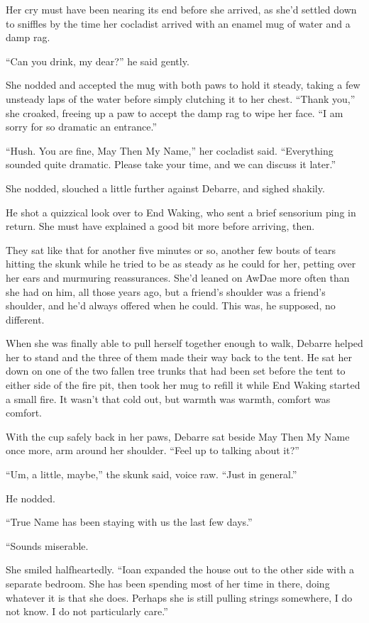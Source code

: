 Her cry must have been nearing its end before she arrived, as she'd settled down to sniffles by the time her cocladist arrived with an enamel mug of water and a damp rag.

``Can you drink, my dear?'' he said gently.

She nodded and accepted the mug with both paws to hold it steady, taking a few unsteady laps of the water before simply clutching it to her chest. ``Thank you,'' she croaked, freeing up a paw to accept the damp rag to wipe her face. ``I am sorry for so dramatic an entrance.''

``Hush. You are fine, May Then My Name,'' her cocladist said. ``Everything sounded quite dramatic. Please take your time, and we can discuss it later.''

She nodded, slouched a little further against Debarre, and sighed shakily.

He shot a quizzical look over to End Waking, who sent a brief sensorium ping in return. She must have explained a good bit more before arriving, then.

They sat like that for another five minutes or so, another few bouts of tears hitting the skunk while he tried to be as steady as he could for her, petting over her ears and murmuring reassurances. She'd leaned on AwDae more often than she had on him, all those years ago, but a friend's shoulder was a friend's shoulder, and he'd always offered when he could. This was, he supposed, no different.

When she was finally able to pull herself together enough to walk, Debarre helped her to stand and the three of them made their way back to the tent. He sat her down on one of the two fallen tree trunks that had been set before the tent to either side of the fire pit, then took her mug to refill it while End Waking started a small fire. It wasn't that cold out, but warmth was warmth, comfort was comfort.

With the cup safely back in her paws, Debarre sat beside May Then My Name once more, arm around her shoulder. ``Feel up to talking about it?''

``Um, a little, maybe,'' the skunk said, voice raw. ``Just in general.''

He nodded.

``True Name has been staying with us the last few days.''

``Sounds miserable.

She smiled halfheartedly. ``Ioan expanded the house out to the other side with a separate bedroom. She has been spending most of her time in there, doing whatever it is that she does. Perhaps she is still pulling strings somewhere, I do not know. I do not particularly care.''

